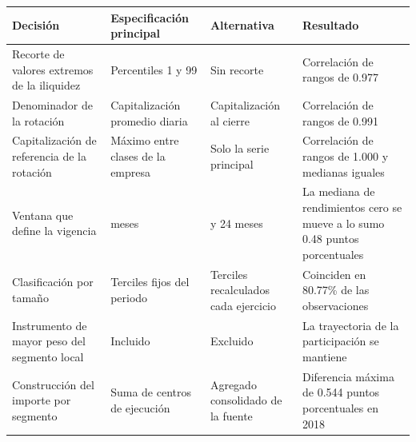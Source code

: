 

{\small
\begin{longtable}[]{@{}
  >{\raggedright\arraybackslash}p{}
  >{\raggedright\arraybackslash}p{}
  >{\raggedright\arraybackslash}p{}
  >{\raggedright\arraybackslash}p{}@{}}
\toprule\noalign{}
\begin{minipage}[b]{\linewidth}\raggedright
\textbf{Decisión}
\end{minipage} & \begin{minipage}[b]{\linewidth}\raggedright
\textbf{Especificación principal}
\end{minipage} & \begin{minipage}[b]{\linewidth}\raggedright
\textbf{Alternativa}
\end{minipage} & \begin{minipage}[b]{\linewidth}\raggedright
\textbf{Resultado}
\end{minipage} \\
\midrule\noalign{}
\endhead
\bottomrule\noalign{}
\endlastfoot
Recorte de valores extremos de la iliquidez & Percentiles 1 y 99 & Sin recorte & Correlación de rangos de 0.977 \\
Denominador de la rotación & Capitalización promedio diaria & Capitalización al cierre & Correlación de rangos de 0.991 \\
Capitalización de referencia de la rotación & Máximo entre clases de la empresa & Solo la serie principal & Correlación de rangos de 1.000 y medianas iguales \\
Ventana que define la vigencia & 12 meses & 6 y 24 meses & La mediana de rendimientos cero se mueve a lo sumo 0.48 puntos porcentuales \\
Clasificación por tamaño & Terciles fijos del periodo & Terciles recalculados cada ejercicio & Coinciden en 80.77\% de las observaciones \\
Instrumento de mayor peso del segmento local & Incluido & Excluido & La trayectoria de la participación se mantiene \\
Construcción del importe por segmento & Suma de centros de ejecución & Agregado consolidado de la fuente & Diferencia máxima de 0.544 puntos porcentuales en 2018 \\
\end{longtable}
}

